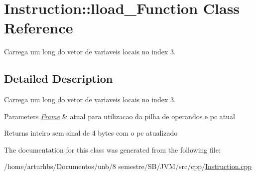 \hypertarget{classInstruction_1_1lload__3Function}{}\section{Instruction\+:\+:lload\+\_\+Function Class Reference}
\label{classInstruction_1_1lload__3Function}


Carrega um long do vetor de variaveis locais no index 3.  




\subsection{Detailed Description}
Carrega um long do vetor de variaveis locais no index 3. 


\begin{DoxyParams}{Parameters}
{\em \hyperlink{classFrame}{Frame}} & atual para utilizacao da pilha de operandos e pc atual \\
\hline
\end{DoxyParams}
\begin{DoxyReturn}{Returns}
inteiro sem sinal de 4 bytes com o pc atualizado 
\end{DoxyReturn}


The documentation for this class was generated from the following file\+:\begin{DoxyCompactItemize}
\item 
/home/arturhbs/\+Documentos/unb/8 semestre/\+S\+B/\+J\+V\+M/src/cpp/\hyperlink{Instruction_8cpp}{Instruction.\+cpp}\end{DoxyCompactItemize}

